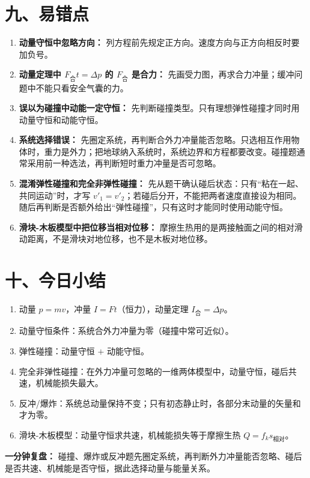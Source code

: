 \section*{九、易错点}

\begin{mistakebox}
\small
\begin{enumerate}[nosep]
  \item \textbf{动量守恒中忽略方向：} 列方程前先规定正方向。速度方向与正方向相反时要加负号。

  \item \textbf{动量定理中 $F_{\text{合}}t = \Delta p$ 的 $F_{\text{合}}$ 是合力：} 先画受力图，再求合力冲量；缓冲问题中不能只看安全气囊的力。

  \item \textbf{误以为碰撞中动能一定守恒：} 先判断碰撞类型。只有理想弹性碰撞才同时用动量守恒和动能守恒。

  \item \textbf{系统选择错误：} 先圈定系统，再判断合外力冲量能否忽略。只选相互作用物体时，重力是外力；把地球纳入系统时，系统边界和方程都要改变。碰撞题通常采用前一种选法，再判断短时重力冲量是否可忽略。

  \item \textbf{混淆弹性碰撞和完全非弹性碰撞：} 先从题干确认碰后状态：只有“粘在一起、共同运动”时，才写 $v'_1=v'_2$；若碰后分开，不能把两者速度直接设为相同。随后再判断是否额外给出“弹性碰撞”，只有这时才能同时使用动能守恒。

  \item \textbf{滑块-木板模型中把位移当相对位移：} 摩擦生热用的是两接触面之间的相对滑动距离，不是滑块对地位移，也不是木板对地位移。
\end{enumerate}
\end{mistakebox}

\section*{十、今日小结}
\enlargethispage{4\baselineskip}

{\small
\begin{enumerate}[nosep]
  \item 动量 $p = mv$，冲量 $I = Ft$（恒力），动量定理 $I_{\text{合}} = \Delta p$。
  \item 动量守恒条件：系统合外力冲量为零（碰撞中常可近似）。
  \item 弹性碰撞：动量守恒 $+$ 动能守恒。
  \item 完全非弹性碰撞：在外力冲量可忽略的一维两体模型中，动量守恒，碰后共速，机械能损失最大。
  \item 反冲/爆炸：系统总动量保持不变；只有初态静止时，各部分末动量的矢量和才为零。
  \item 滑块-木板模型：动量守恒求共速，机械能损失等于摩擦生热 $Q=f_k s_{\text{相对}}$。
\end{enumerate}

\textbf{一分钟复盘：} 碰撞、爆炸或反冲题先圈定系统，再判断外力冲量能否忽略、碰后是否共速、机械能是否守恒，据此选择动量与能量关系。
}

